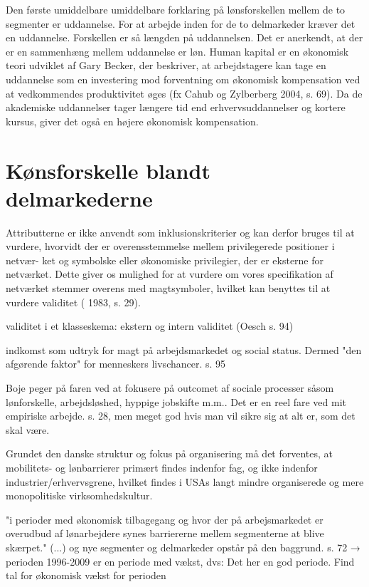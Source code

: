 Den første umiddelbare umiddelbare forklaring på lønsforskellen mellem de to segmenter er uddannelse. For at arbejde inden for de to delmarkeder kræver det en uddannelse. Forskellen er så længden på uddannelsen. Det er anerkendt, at der er en sammenhæng mellem uddannelse er løn. Human kapital er en økonomisk teori udviklet af Gary Becker, der beskriver, at arbejdstagere kan tage en uddannelse som en investering mod forventning om økonomisk kompensation ved at vedkommendes produktivitet øges (fx Cahub og Zylberberg 2004, s. 69). Da de akademiske uddannelser tager længere tid end erhvervsuddannelser og kortere kursus, giver det også en højere økonomisk kompensation. 


\newpage \section{Kønsforskelle blandt delmarkederne \label{sec_delanalyse2_loen}}


\iffalse
\label{iffalse}

Attributterne er ikke anvendt som inklusionskriterier og kan derfor bruges til at
vurdere, hvorvidt der er overensstemmelse mellem privilegerede positioner i netvær-
ket og symbolske eller økonomiske privilegier, der er eksterne for netværket. Dette giver
os mulighed for at vurdere om vores specifikation af netværket stemmer overens med
magtsymboler, hvilket kan benyttes til at vurdere validitet ( 1983, s. 29).


validitet i et klasseskema: ekstern og intern validitet (Oesch s. 94)

indkomst som udtryk for magt på arbejdsmarkedet og social status. Dermed "den afgørende faktor" for menneskers livschancer. s. 95

Boje peger på faren ved at fokusere på outcomet af sociale processer såsom lønforskelle, arbejdsløshed, hyppige jobskifte m.m.. Det er en reel fare ved mit empiriske arbejde. s. 28, men meget god hvis man vil sikre sig at alt er, som det skal være. 

Grundet den danske struktur og fokus på organisering må det forventes, at mobilitets- og lønbarrierer primært findes indenfor fag, og ikke indenfor industrier/erhvervsgrene, hvilket findes i USAs langt mindre organiserede og mere monopolitiske virksomhedskultur. 

"i perioder med økonomisk tilbagegang og hvor der på arbejsmarkedet er overudbud af lønarbejdere synes barriererne mellem segmenterne at blive skærpet." (...) og nye segmenter og delmarkeder opstår på den baggrund. s. 72
→ perioden 1996-2009 er en periode med vækst, dvs: Det her en god periode. Find tal for økonomisk vækst for perioden


